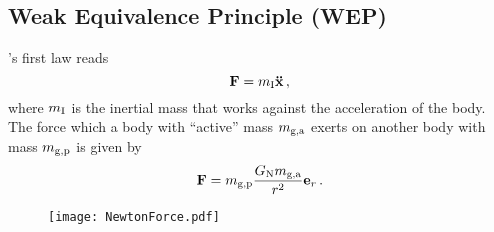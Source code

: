 \subsection*{Weak Equivalence Principle (WEP)}
's first law reads
\begin{equation}
    \vec{F}=m\textsubscript{I} \vec{\ddot{x}} \, ,
\end{equation}
where $m\textsubscript{I}$ is the inertial mass that works against the acceleration of the body.
The force which a body with ``active'' mass $m\textsubscript{g,a}$ exerts on
another body with mass $m\textsubscript{g,p}$ is given by 
\begin{equation}
    \vec{F}=m\textsubscript{g,p}\frac{G\textsubscript{N}m\textsubscript{g,a}}{r^2}\vec{e}_r \, .
\end{equation}
\begin{figure}[hbtp!]
\centering
 \texttt{[image: NewtonForce.pdf]}
\caption{}
\end{figure}

